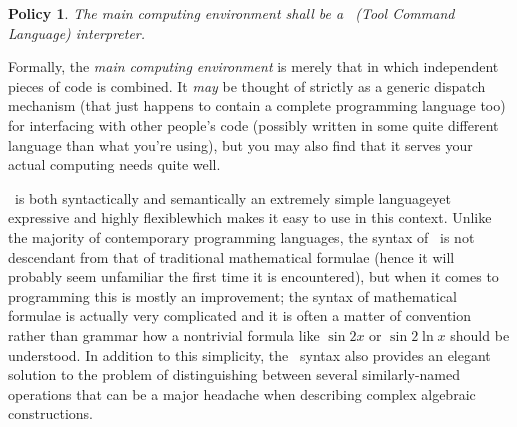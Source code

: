 \documentclass{mtmtcl}
\theoremstyle{plain}
\newtheorem{policy}{Policy}
\theoremstyle{remark}
\begin{document}
\begin{policy} \label{Policy:Tcl}
  The main computing environment shall be a \Tcl~(Tool Command 
  Language) interpreter.
\end{policy}

Formally, the \emph{main computing environment} is merely that in 
which independent pieces of code is combined. It \emph{may} be 
thought of strictly as a generic dispatch mechanism (that just happens 
to contain a complete programming language too) for interfacing with 
other people's code (possibly written in some quite different language 
than what you're using), but you may also find that it serves your 
actual computing needs quite well.

\Tcl\ is both syntactically and semantically an extremely simple 
language\Ldash yet expressive and highly flexible\Rdash which makes 
it easy to use in this context. Unlike the majority of contemporary 
programming languages, the syntax of \Tcl\ is not descendant from that 
of traditional mathematical formulae (hence it will probably seem 
unfamiliar the first time it is encountered), but when it comes to 
programming this is mostly an improvement; the syntax of mathematical 
formulae is actually very complicated and it is often a matter of 
convention rather than grammar how a nontrivial formula like $\sin 
2x$ or $\sin 2\ln x$ should be understood. In addition to this 
simplicity, the \Tcl\ syntax also provides an elegant solution to 
the problem of distinguishing between several similarly-named 
operations that can be a major headache when describing complex 
algebraic constructions.
\end{document}
